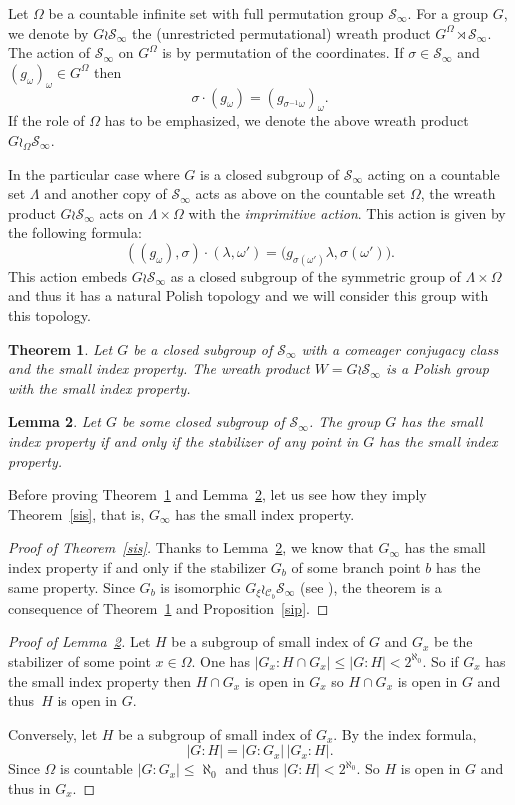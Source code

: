 \documentclass[JEP,XML,SOM,Unicode,NoFloatCountersInSection]{cedram}
\let\mathcal\mathscr
\theoremstyle{plain}
\newtheorem{thm}{Theorem}[section]
\newtheorem{lem}[thm]{Lemma}
\theoremstyle{definition}
\newcommand{\cC}{\mathcal{C}}
\newcommand{\cS}{\mathcal{S}}
\newcommand{\sinf}{\cS_\infty}
\begin{document}
Let $\Omega$ be a countable infinite set with full permutation group $\sinf$. For a group $G$, we denote by $G\wr \sinf$ the (unrestricted permutational) wreath product $G^\Omega\rtimes\sinf$. The action of $\sinf$ on $G^\Omega$ is by permutation of the coordinates. If $\sigma\in\sinf$ and $(g_\omega)_\omega\in G^\Omega$ then
\[
\sigma\cdot(g_\omega)=(g_{\sigma^{-1}\omega})_\omega.
\]
If the role of $\Omega$ has to be emphasized, we denote the above wreath product $G\wr_\Omega \sinf$.

In the particular case where $G$ is a closed subgroup of $\sinf$ acting on a countable set $\Lambda$ and another copy of $\sinf$ acts as above on the countable set $\Omega$, the wreath product $G\wr\sinf$ acts on $\Lambda\times \Omega$ with the \emph{imprimitive action}. This action is given by the following formula:
\[
\left((g_\omega),\sigma\right)\cdot(\lambda,\omega')=\bigl(g_{\sigma(\omega')}\lambda,\sigma(\omega')\bigr).
\]
This action embeds $G\wr\sinf$ as a closed subgroup of the symmetric group of $\Lambda\times \Omega$ and thus it has a natural Polish topology and we will consider this group with this topology.
\begin{thm}\label{wr} Let $G$ be a closed subgroup of $\sinf$ with a comeager conjugacy class and the small index property. The wreath product $W=G\wr\sinf$ is a Polish group with the small index property.\end{thm}

\begin{lem}\label{sisf}Let $G$ be some closed subgroup of $\sinf$. The group $G$ has the small index property if and only if the stabilizer of any point in $G$ has the small index property.
\end{lem}
Before proving Theorem~\ref{wr} and Lemma~\ref{sisf}, let us see how they imply Theorem~\ref{sis}, that is, $G_\infty$ has the small index property.
\begin{proof}[Proof of Theorem~\ref{sis}] Thanks to Lemma~\ref{sisf}, we know that $G_\infty$ has the small index property if and only if the stabilizer $G_b$ of some branch point $b$ has the same property. Since $G_b$ is isomorphic $G_\xi\wr_{\cC_b}\sinf$ (see \cite[Lem.\,7.1]{DM_dendritesII}), the theorem is a consequence of Theorem~\ref{wr} and Proposition~\ref{sip}.
\end{proof}

\begin{proof}[Proof of Lemma~\ref{sisf}] Let $H$ be a subgroup of small index of $G$ and $G_x$ be the stabilizer of some point $x\in\Omega$. One has $|G_x\colon H\cap G_x|\leq|G\colon H|<2^{\aleph_0}$. So if $G_x$ has the small index property then $H\cap G_x$ is open in $G_x$ so $H\cap G_x$ is open in $G$ and thus~$H$ is open in $G$.

Conversely, let $H$ be a subgroup of small index of $G_x$. By the index formula,
\[
|G\colon H|= |G\colon G_x|\, |G_x\colon H|.
\]
Since $\Omega$ is countable $|G\colon G_x|\leq\aleph_0$ and thus $|G\colon H|<2^{\aleph_0}$. So $H$ is open in $G$ and thus in $G_x$.
\end{proof}
\end{document}
